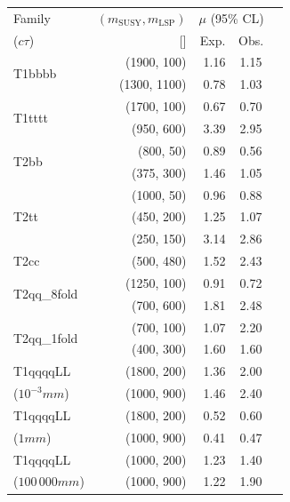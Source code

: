 \clearpage
\begin{table}
  \label{tab:benchmarks_aux}
  \centering
    \begin{tabular}{ lrrcc }
      \hline
      Family
      & $(m_{\text{SUSY}}, m_{\mathrm{LSP}})$
      & \multicolumn{2}{c}{$\mu$ (95\% CL)}                                                                            \\ [0.3ex]
      ($c\tau$)
      & [\GeVns{}]
      & Exp.
      & Obs.                                                                                                           \\ [0.3ex]
      \hline
      \multirow{2}{*}{T1bbbb}
& (1900, 100) 
& 1.16 & 1.15 \\
& (1300, 1100)
& 0.78 & 1.03 \\ [0.5ex]
      \multirow{2}{*}{T1tttt}
& (1700, 100) 
& 0.67 & 0.70 \\
& (950, 600)  
& 3.39 & 2.95 \\ [0.5ex]
      \multirow{2}{*}{T2bb}
& (800, 50)
& 0.89 & 0.56 \\
& (375, 300)
& 1.46 & 1.05 \\ [0.5ex]
      \multirow{3}{*}{T2tt}
& (1000, 50)  
& 0.96 & 0.88 \\
& (450, 200)  
& 1.25 & 1.07 \\ 
& (250, 150)  
& 3.14 & 2.86 \\ [0.5ex]
      \multirow{1}{*}{T2cc}
& (500, 480)  
& 1.52 & 2.43 \\ [0.5ex]
      \multirow{2}{*}{T2qq\_8fold}
& (1250, 100) 
& 0.91 & 0.72 \\
& (700, 600)  
& 1.81 & 2.48 \\ [0.5ex]
      \multirow{2}{*}{T2qq\_1fold}
& (700, 100)  
& 1.07 & 2.20 \\
& (400, 300)  
& 1.60 & 1.60 \\ [0.5ex]
      T1qqqqLL
& (1800, 200)
& 1.36 & 2.00 \\
     ($10^{-3}\unit{mm}$)
& (1000, 900)
& 1.46 & 2.40 \\ [0.5ex]
      T1qqqqLL
& (1800, 200)
& 0.52 & 0.60 \\
     ($1\unit{mm}$)
& (1000, 900)
& 0.41 & 0.47 \\ [0.5ex]
      T1qqqqLL
& (1000, 200)
& 1.23 & 1.40 \\
     ($100\,000\unit{mm}$)
& (1000, 900)
& 1.22 & 1.90 \\
      \hline
    \end{tabular}
\end{table}

